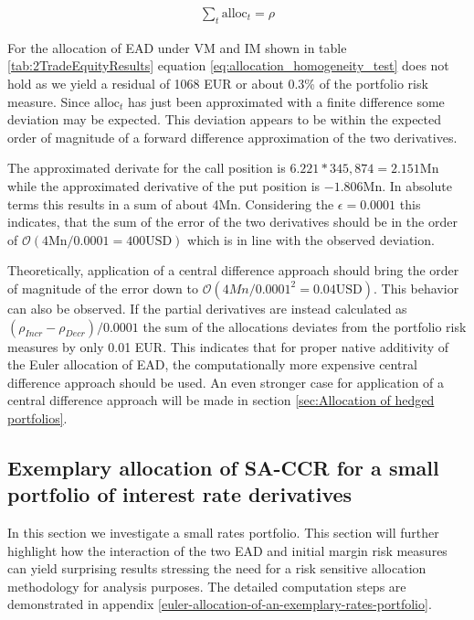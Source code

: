 \documentclass[../Thesis_AHoecherl.tex]{subfiles}
\begin{document}
    \begin{align}
        \label{eq:allocation_homogeneity_test}
        \sum_t{\text{alloc}_t} = \rho
    \end{align}
    
    
    For the allocation of \gls{EAD} under \gls{VM} and \gls{IM} shown in table \ref{tab:2TradeEquityResults} equation \ref{eq:allocation_homogeneity_test} does not hold as we yield a residual of 1068 EUR or about 0.3\% of the portfolio risk measure. Since $\text{alloc}_t$ has just been approximated with a finite difference some deviation may be expected. This deviation appears to be within the expected order of magnitude of a forward difference approximation of the two derivatives.

    The approximated derivate for the call position is $6.221 * 345,874 = 2.151 \text{Mn}$ while the approximated derivative of the put position is $-1.806 \text{Mn}$. 
    In absolute terms this results in a sum of about 4Mn. Considering the $\epsilon = 0.0001$ this indicates, that the sum of the error of the two derivatives should be in the order of $\mathcal{O}\left(4\text{Mn}/0.0001 = 400 \text{USD}\right)$ which is in line with the observed deviation.

    Theoretically, application of a central difference approach should bring the order of magnitude of the error down to $\mathcal{O}\left(4Mn/0.0001^2 = 0.04 \text{USD}\right)$.
     This behavior can also be observed. 
    If the partial derivatives are instead calculated as $(\rho_{Incr}-\rho_{Decr})/0.0001$ the sum of the allocations deviates from the portfolio risk measures by only 0.01 EUR. 
    This indicates that for proper native additivity of the Euler allocation of EAD, the computationally more expensive central difference approach should be used.
    An even stronger case for application of a central difference approach will be made in section \ref{sec:Allocation of hedged portfolios}.

    \subsection{Exemplary allocation of SA-CCR for a small portfolio of interest rate derivatives\label{sec:Exemplary allocation of SA-CCR for a small portfolio of interst rate derivatives}}

    In this section we investigate a small rates portfolio. This section will further highlight how the interaction of the two \gls{EAD} and initial margin risk measures can yield surprising results stressing the need for a risk sensitive allocation methodology for analysis purposes. The detailed computation steps are demonstrated in appendix \ref{euler-allocation-of-an-exemplary-rates-portfolio}.
\end{document}
